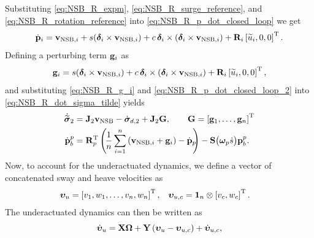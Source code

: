 Substituting \eqref{eq:NSB_R_expm}, \eqref{eq:NSB_R_surge_reference}, and \eqref{eq:NSB_R_rotation_reference} into \eqref{eq:NSB_R_p_dot_closed_loop} we get 
\begin{equation}
    \dot{\mathbf{p}}_i = \mathbf{v}_{{\rm NSB}, i} 
                + s(\bm{\delta}_i \times \mathbf{v}_{{\rm NSB}, i})
                + c\,\bm{\delta}_i\times(\bm{\delta}_i \times \mathbf{v}_{{\rm NSB}, i})
                + \mathbf{R}_{i}\left[\widetilde{u}_i, 0, 0\right]^{\mathrm{T}}.
    \label{eq:NSB_R_p_dot_closed_loop_2}
\end{equation}
Defining a perturbing term $\mathbf{g}_i$ as 
\begin{equation}
    \mathbf{g}_i = s(\bm{\delta}_i \times \mathbf{v}_{{\rm NSB}, i}) 
                + c\,\bm{\delta}_i\times(\bm{\delta}_i \times \mathbf{v}_{{\rm NSB}, i}) 
                + \mathbf{R}_{i}\left[\widetilde{u}_i, 0, 0\right]^{\mathrm{T}},
                \label{eq:NSB_R_g_i}
\end{equation}
and substituting \eqref{eq:NSB_R_g_i} and \eqref{eq:NSB_R_p_dot_closed_loop_2} into \eqref{eq:NSB_R_dot_sigma_tilde} yields 
\begin{subequations}
    \begin{align}
        \dot{\widetilde{\bs{\sigma}}}_2 &= \mat{J}_2\ivel_{\rm NSB} - \dot{\bs{\sigma}}_{d, 2}
                                        +\mat{J}_2\mat{G}, \qquad \mat{G} = \inlinevector{\mat{g}_1, \ldots, \mat{g}_n} \\
        \dot{\mat{p}}_b^p &= \mat{R}_p\T\left(\!\frac{1}{n}\sum_{i=1}^n\left(\ivel_{{\rm NSB}, i} + \mat{g}_i\right) - \dot{\mat{p}}_{\mathrlap{p}}\right) - \mat{S}\big(\bs{\omega}_p\dot{s}\big)\mat{p}_b^p \mathrlap{.}
    \end{align} \label{eq:NSB_R_outer_loop}
\end{subequations}
Now, to account for the underactuated dynamics, we define a vector of concatenated sway and heave velocities as 
\begin{align}
    \bm{\upsilon}_u &= \left[v_1, w_1, \ldots, v_n, w_n\right]^{\mathrm{T}}, &
    \bm{\upsilon}_{u, c} &= \mathbf{1}_n \otimes \left[v_c, w_c\right]^{\mathrm{T}}.
\end{align}
The underactuated dynamics can then be written as
\begin{equation}
    \dot{\bm{\upsilon}}_u = \mathbf{X}\bm{\Omega} + \mathbf{Y}\left(\bm{\upsilon}_u - \bm{\upsilon}_{u, c}\right) + \dot{\bm{\upsilon}}_{u, c}, \label{eq:NSB_R_underactuated_dynamics_closed_loop}
\end{equation}
